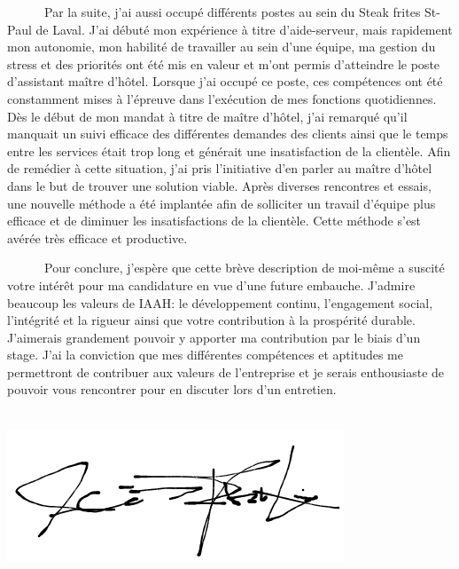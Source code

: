 \documentclass{article}
\begin{document}
\begin{textblock}{11.35}
	\ \ \ \ \ \ Par la suite, j’ai aussi occupé différents postes au sein  du Steak frites St-Paul de Laval. J’ai débuté mon expérience à titre d’aide-serveur, mais rapidement mon autonomie, mon habilité de travailler au sein d’une équipe, ma gestion du stress et des priorités ont été mis en valeur et m’ont permis d’atteindre le poste d’assistant maître d’hôtel. Lorsque j’ai occupé ce poste, ces compétences ont été constamment mises à l’épreuve dans l’exécution de mes fonctions quotidiennes.  Dès le début de mon mandat à titre de maître d’hôtel, j’ai remarqué qu’il manquait un suivi efficace des différentes demandes des clients ainsi que le temps entre les services était trop long et générait une insatisfaction de la clientèle. Afin de remédier à cette situation, j’ai pris l’initiative d’en parler au maître d’hôtel dans le but de trouver une solution viable. Après diverses rencontres et essais, une nouvelle méthode a été implantée afin de solliciter un travail d’équipe plus efficace et de diminuer les insatisfactions de la clientèle. Cette méthode s’est avérée très efficace et productive.

\bigskip
	

	\ \ \ \ \ \ Pour conclure, j'espère que cette brève description de moi-même a suscité votre intérêt pour ma candidature en vue d'une future embauche. J’admire beaucoup les valeurs de IAAH: le développement continu, l’engagement social, l’intégrité et la rigueur ainsi que votre contribution à la prospérité durable. J’aimerais grandement pouvoir y apporter ma contribution par le biais d’un stage. J'ai la conviction que mes différentes compétences et aptitudes me permettront de contribuer aux valeurs de l'entreprise et je serais enthousiaste de pouvoir vous rencontrer pour en discuter lors d'un entretien.
\bigskip

\textcolor{black}{} \\

\includegraphics[height=5\baselineskip]{signature.png}


\end{textblock}
\end{document}
